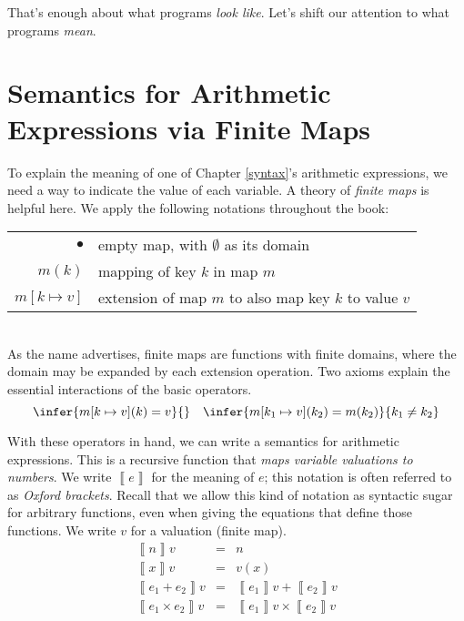 \documentclass{amsbook}
\theoremstyle{definition}
\theoremstyle{remark}
\numberwithin{section}{chapter}
\numberwithin{equation}{chapter}
\begin{document}
That's enough about what programs \emph{look like}.
Let's shift our attention to what programs \emph{mean}.

\section{Semantics for Arithmetic Expressions via Finite Maps}

\newcommand{\mempty}[0]{\bullet}
\newcommand{\msel}[2]{#1(#2)}
\newcommand{\mupd}[3]{#1[#2 \mapsto #3]}

To explain the meaning of one of Chapter \ref{syntax}'s arithmetic expressions, we need a way to indicate the value of each variable.
\encoding
A theory of \emph{finite maps} is helpful here.
We apply the following notations throughout the book: \\

\begin{tabular}{rl}
  $\mempty$ & empty map, with $\emptyset$ as its domain \\
  $\msel{m}{k}$ & mapping of key $k$ in map $m$ \\
  $\mupd{m}{k}{v}$ & extension of map $m$ to also map key $k$ to value $v$
\end{tabular} \\

As the name advertises, finite maps are functions with finite domains, where the domain may be expanded by each extension operation.
Two axioms explain the essential interactions of the basic operators.
$$\infer{\msel{\mupd{m}{k}{v}}{k} = v}{}
\quad
\infer{\msel{\mupd{m}{k_1}{v}}{k_2} = m(k_2)}{
  k_1 \neq k_2
}$$

\newcommand{\denote}[1]{{\left \llbracket #1 \right \rrbracket}}

With these operators in hand, we can write a semantics for arithmetic expressions.
This is a recursive function that \emph{maps variable valuations to numbers}.
We write $\denote{e}$ for the meaning of $e$; this notation is often referred to as \emph{Oxford brackets}.
Recall that we allow this kind of notation as syntactic sugar for arbitrary functions, even when giving the equations that define those functions.
We write $v$ for a valuation (finite map).
\encoding
\begin{eqnarray*}
  \denote{n}v &=& n \\
  \denote{x}v &=& v(x) \\
  \denote{e_1 + e_2}v &=& \denote{e_1}v + \denote{e_2}v \\
  \denote{e_1 \times e_2}v &=& \denote{e_1}v \times \denote{e_2}v
\end{eqnarray*}
\end{document}
